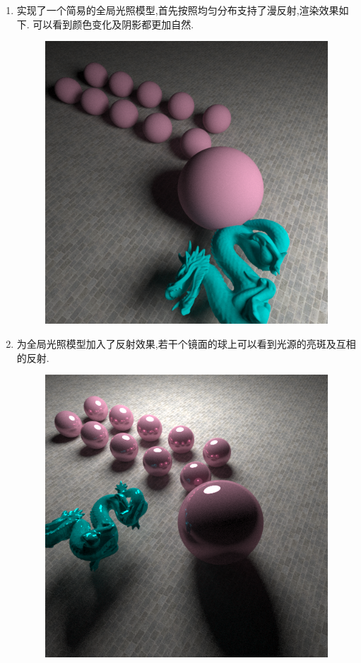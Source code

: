 \begin{enumerate}
  \item 实现了一个简易的全局光照模型,首先按照均匀分布支持了漫反射,渲染效果如下.
    可以看到颜色变化及阴影都更加自然.
    \begin{figure}[H]
      \centering
      \includegraphics[scale=0.4]{img/gllu_first.png}
    \end{figure}

  \item 为全局光照模型加入了反射效果,若干个镜面的球上可以看到光源的亮斑及互相的反射.
    \begin{figure}[H]
      \centering
      \includegraphics[scale=0.6]{img/gllu_refl.png}
    \end{figure}




\end{enumerate}

